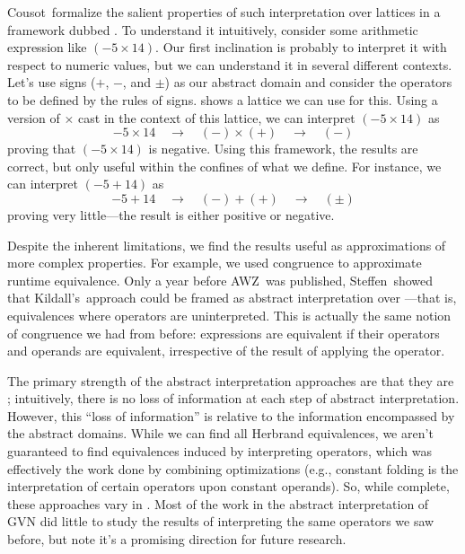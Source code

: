 Cousot~formalize the salient properties of such interpretation over
lattices in a framework dubbed .  To understand
it intuitively, consider some arithmetic expression like $(-5 \times 14)$.  Our
first inclination is probably to interpret it with respect to numeric values,
but we can understand it in several different contexts.  Let's use signs ($+$,
$-$, and $\pm$) as our abstract domain and consider the operators to be defined
by the rules of signs.   shows a lattice we can use for this.
Using a version of $\times$ cast in the context of this lattice, we can
interpret $(-5 \times 14)$ as
%
$$-5 \times 14 \quad\to\quad (-) \times (+) \quad\to\quad (-)$$
%
proving that $(-5 \times 14)$ is negative.  Using this framework, the results
are correct, but only useful within the confines of what we define.  For
instance, we can interpret $(-5 + 14)$ as
%
$$-5 + 14 \quad\to\quad (-) + (+) \quad\to\quad (\pm)$$
%
proving very little---the result is either positive or negative.

Despite the inherent limitations, we find the results useful as approximations
of more complex properties.  For example, we used congruence to approximate
runtime equivalence.  Only a year before AWZ~was published,
Steffen~showed that Kildall's~approach could be
framed as abstract interpretation over ---that is,
equivalences where operators are uninterpreted.  This is actually the same
notion of congruence we had from before: expressions are equivalent if their
operators and operands are equivalent, irrespective of the result of applying
the operator.

The primary strength of the abstract interpretation approaches are that they
are ; intuitively, there is no loss of information at each step
of abstract interpretation.  However, this ``loss of information'' is relative
to the information encompassed by the abstract domains.  While we
can find all Herbrand equivalences, we aren't guaranteed to find equivalences
induced by interpreting operators, which was effectively the work done by
combining optimizations (e.g., constant folding is the interpretation of
certain operators upon constant operands).  So, while complete, these
approaches vary in .  Most of the work in the abstract
interpretation of \gls{GVN} did little to study the results of interpreting the
same operators we saw before, but note it's a promising direction for future
research.

